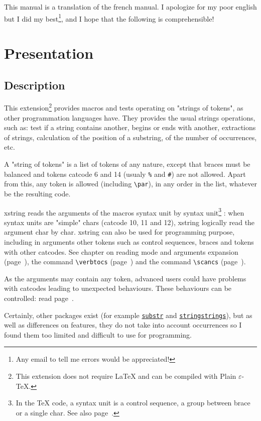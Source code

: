 \documentclass[a4paper,10pt]{article}
\newcommand\guill[1]{"#1"}
\newcommand\US{syntax unit\xspace}
\newcommand\USs{syntax units\xspace}
\newcommand\Xstring{\textsf{xstring}\xspace}
\newcommand\verbinline{\lstinline[basicstyle=\normalsize\ttfamily]}
\begin{document}
\tableofcontents

This manual is a translation of the french manual. I apologize for my poor english but I did my best\footnote{Any email to tell me errors would be appreciated!}, and I hope that the following is comprehensible!
\section{Presentation}
\subsection{Description}
This extension\footnote{This extension does not require \LaTeX{} and can be compiled with Plain $\varepsilon$-\TeX{}.} provides macros and tests operating on "strings of tokens", as other programmation languages have. They provides the usual strings operations, such as: test if a string contains another, begins or ends with another, extractions of strings, calculation of the position of a substring, of the number of occurrences, etc.\medskip

A "string of tokens" is a list of tokens of any nature, except that braces must be balanced and tokens catcode 6 and 14 (usualy \verb|%| and \verb|#|) are not allowed. Apart from this, any token is allowed (including \verbinline|\par|), in any order in the list, whatever be the resulting code.\medskip

\Xstring reads the arguments of the macros \US by \US\footnote{In the \TeX{} code, a \US is a control sequence, a group between brace or a single char. See also page~\pageref{developpementarguments}.} : when \USs are \guill{simple} chars (catcode 10, 11 and 12), \Xstring logically read the argument char by char. \Xstring can also be used for programming purpose, including in arguments other tokens such as control sequences, braces and tokens with other catcodes. See chapter on reading mode and arguments expansion (page~\pageref{developpementarguments}), the command \verbinline|\verbtocs| (page~\pageref{verbtocs}) and the command \verbinline|\scancs| (page~\pageref{scancs}).\medskip

As the arguments may contain any token, advanced users could have problems with catcodes leading to unexpected behaviours. These behaviours can be controlled: read page~\pageref{macrosetoilees}.\medskip

Certainly, other packages exist (for example \href{http://www.ctan.org/tex-archive/macros/latex/contrib/substr/}{\nolinkurl{substr}} and \href{http://www.ctan.org/tex-archive/macros/latex/contrib/stringstrings/}{\nolinkurl{stringstrings}}), but as well as differences on features, they do not take into account occurrences so I found them too limited and difficult to use for programming.
\end{document}
